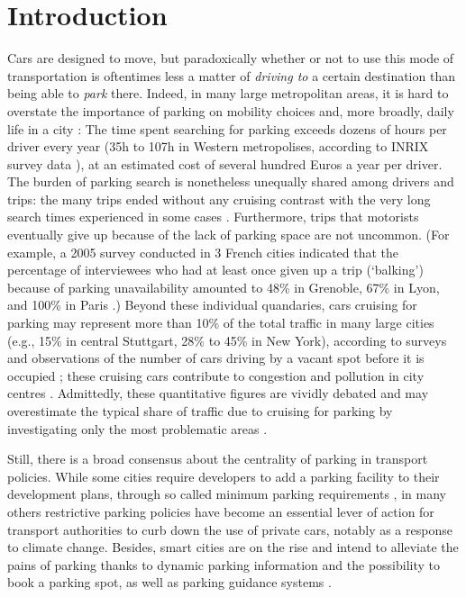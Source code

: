 \documentclass[trsc,reprint]{informs3}
\newcommand{\AN}[1]{#1}
\begin{document}
\date{}

\maketitle
\HISTORY{}

\section{Introduction}

Cars are designed to move, \AN{but paradoxically} whether or not to use this mode of transportation is oftentimes less a matter of \emph{driving to} a certain destination 
than being able to \emph{park} there. 
Indeed, in many large metropolitan areas, it is hard to overstate the importance
of parking on mobility choices and, more broadly, daily life in a city \citep{shoup2018parking}: The time spent searching for parking exceeds dozens of hours per driver every year (35h to 107h in Western metropolises, according to INRIX survey data \citep{INRIX2017}), at an estimated cost of several hundred Euros a year per driver.
\AN{The burden of parking search is nonetheless unequally shared among drivers and trips: the many trips ended without any cruising contrast with the very long search times experienced in
some cases  \citep{mantouka2021deep}.}
Furthermore, trips that motorists eventually
give up because of the lack of parking space are not uncommon.
(For example, a 2005 survey conducted in 3 French cities indicated that the
percentage of interviewees who had at least once given up a trip (`balking') because of
parking unavailability amounted to 48\% in Grenoble, 67\% in Lyon, and 100\% in Paris \citep{SARECO2005}.) 
Beyond these individual quandaries, cars cruising for parking may represent more than 10\% of the total traffic 
in many large cities (e.g., 15\% in central Stuttgart, 28\% to 45\% in New York), according to surveys and observations of the number of cars driving by a vacant spot before it is occupied  \citep{shoup2018parking,hampshire2018share}; \AN{these cruising cars} contribute to congestion and pollution in city centres
\AN{\citep{gallo2011multilayer}}. 
Admittedly, these quantitative figures are vividly debated and may overestimate the typical share of traffic due to cruising for parking 
by investigating only the most problematic areas \citep{weinberger2020parking}.

Still, there is a broad consensus about the centrality of parking in transport policies. While some cities require developers to add a parking facility to their development plans, through so called minimum parking requirements \citep[chap. 3]{shoup2018parking}, in many others restrictive parking policies have become an essential lever of action for
transport authorities \citep{boujnah2017modelisation,polak1990parking} to curb down the use of private cars, notably as a response to climate change. Besides,
smart cities are on the rise and intend
to alleviate the pains of parking thanks to dynamic parking information and the possibility to book a parking spot, as well as parking guidance systems \citep{al2019smart}.
\end{document}
